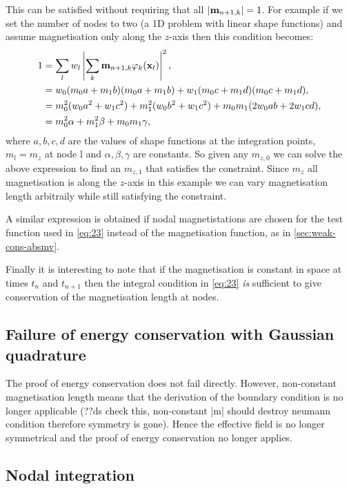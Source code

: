This can be satisfied without requiring that all $\left|{\mathbf{m}_{n+1, k}} \right| = 1$.
For example if we set the number of nodes to two (a 1D problem with linear shape functions) and assume magnetisation only along the $z$-axis then this condition becomes:
\begin{equation}
  \begin{aligned}
    1 &= \sum_l w_l \left|{\sum_k \mathbf{m}_{n+1, k} \varphi_k(\mathbf{x}_l)} \right|^2, \\
    &= w_0 (m_0 a + m_1 b)(m_0 a + m_1 b) + w_1 (m_0 c + m_1 d)(m_0 c + m_1 d), \\
    &= m_0^2 (w_0 a^2 + w_1 c^2) + m_1^2 (w_0 b^2 + w_1 c^2) + m_0 m_1 (2w_0ab + 2w_1cd), \\
    &= m_0^2 \alpha + m_1^2 \beta + m_0 m_1 \gamma, \\
  \end{aligned}
\end{equation}
where $a,b,c,d$ are the values of shape functions at the integration points, $m_l = m_{z}$ at node l and $\alpha, \beta, \gamma$ are constants.
So given any $m_{z,0}$ we can solve the above expression to find an $m_{z,1}$ that satisfies the constraint.
Since $m_z$ all magnetisation is along the $z$-axis in this example we can vary magnetisation length arbitraily while still satisfying the constraint.

A similar expression is obtained if nodal magnetistations are chosen for the test function used in \eqref{eq:23} instead of the magnetisation function, as in \autoref{sec:weak-cons-absmv}.

Finally it is interesting to note that if the magnetisation is constant in space at times $t_n$ and $t_{n+1}$ then the integral condition in \eqref{eq:23} \emph{is} sufficient to give conservation of the magnetisation length at nodes.


\subsection{Failure of energy conservation with Gaussian quadrature}

The proof of energy conservation does not fail directly.
However, non-constant magnetisation length means that the derivation of the boundary condition is no longer applicable (??ds check this, non-constant |m| should destroy neumann condition therefore symmetry is gone).
Hence the effective field is no longer symmetrical and the proof of energy conservation no longer applies.

\subsection{Nodal integration}


